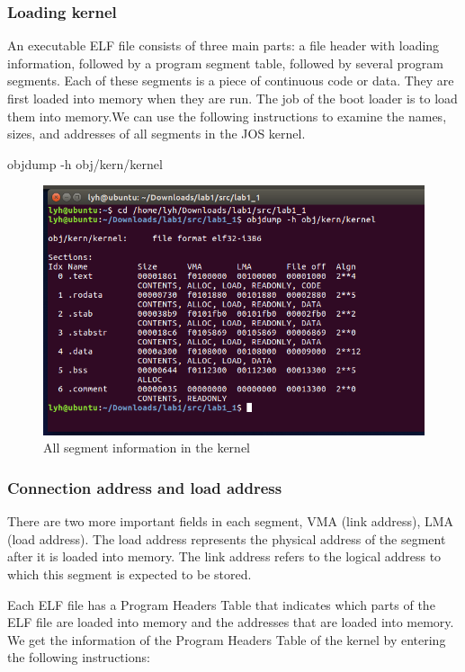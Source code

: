 \subsubsection{Loading kernel}
An executable ELF file consists of three main parts: a file header with loading information, followed by a program segment table, followed by several program segments. Each of these segments is a piece of continuous code or data. They are first loaded into memory when they are run. The job of the boot loader is to load them into memory.We can use the following instructions to examine the names, sizes, and addresses of all segments in the JOS kernel.

{\color{red} objdump -h obj/kern/kernel}

\begin{figure}[H]
  \centering
  \includegraphics[width=0.8\linewidth]{figure/kernel_sections}
  \caption{All segment information in the kernel}\label{2}
\end{figure}

\subsubsection{Connection address and load address}
There are two more important fields in each segment, VMA (link address), LMA (load address). The load address represents the physical address of the segment after it is loaded into memory. The link address refers to the logical address to which this segment is expected to be stored.

Each ELF file has a Program Headers Table that indicates which parts of the ELF file are loaded into memory and the addresses that are loaded into memory. We get the information of the Program Headers Table of the kernel by entering the following instructions:

